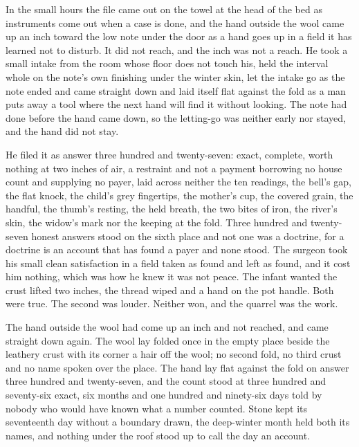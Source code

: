 In the small hours the file came out on the towel at the head of the bed as instruments come out when a case is done, and the hand outside the wool came up an inch toward the low note under the door as a hand goes up in a field it has learned not to disturb. It did not reach, and the inch was not a reach. He took a small intake from the room whose floor does not touch his, held the interval whole on the note's own finishing under the winter skin, let the intake go as the note ended and came straight down and laid itself flat against the fold as a man puts away a tool where the next hand will find it without looking. The note had done before the hand came down, so the letting-go was neither early nor stayed, and the hand did not stay.

He filed it as answer three hundred and twenty-seven: exact, complete, worth nothing at two inches of air, a restraint and not a payment borrowing no house count and supplying no payer, laid across neither the ten readings, the bell's gap, the flat knock, the child's grey fingertips, the mother's cup, the covered grain, the handful, the thumb's resting, the held breath, the two bites of iron, the river's skin, the widow's mark nor the keeping at the fold. Three hundred and twenty-seven honest answers stood on the sixth place and not one was a doctrine, for a doctrine is an account that has found a payer and none stood. The surgeon took his small clean satisfaction in a field taken as found and left as found, and it cost him nothing, which was how he knew it was not peace. The infant wanted the crust lifted two inches, the thread wiped and a hand on the pot handle. Both were true. The second was louder. Neither won, and the quarrel was the work.

The hand outside the wool had come up an inch and not reached, and came straight down again. The wool lay folded once in the empty place beside the leathery crust with its corner a hair off the wool; no second fold, no third crust and no name spoken over the place. The hand lay flat against the fold on answer three hundred and twenty-seven, and the count stood at three hundred and seventy-six exact, six months and one hundred and ninety-six days told by nobody who would have known what a number counted. Stone kept its seventeenth day without a boundary drawn, the deep-winter month held both its names, and nothing under the roof stood up to call the day an account.
